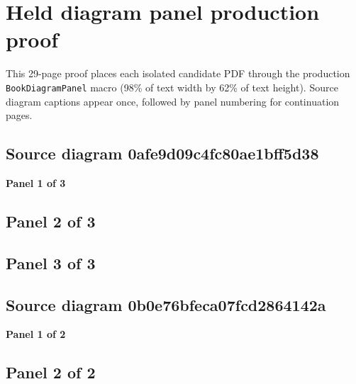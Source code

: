 \documentclass[10pt,twoside,openany]{book}
\begin{document}
\chapter*{Held diagram panel production proof}
This 29-page proof places each isolated candidate PDF through the production \texttt{BookDiagramPanel} macro (98\% of text width by 62\% of text height). Source diagram captions appear once, followed by panel numbering for continuation pages.
\clearpage
\section*{Source diagram 0afe9d09c4fc80ae1bff5d38}
\textbf{Panel 1 of 3}\par
\vspace{0.5em}
\begin{center}
\end{center}
\clearpage
\section*{Panel 2 of 3}
\vspace{0.5em}
\begin{center}
\end{center}
\clearpage
\section*{Panel 3 of 3}
\vspace{0.5em}
\begin{center}
\end{center}
\clearpage
\section*{Source diagram 0b0e76bfeca07fcd2864142a}
\textbf{Panel 1 of 2}\par
\vspace{0.5em}
\begin{center}
\end{center}
\clearpage
\section*{Panel 2 of 2}
\vspace{0.5em}
\begin{center}
\end{center}
\clearpage
\end{document}
